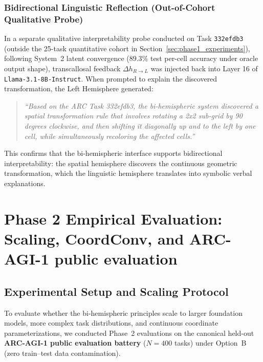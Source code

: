 \documentclass[11pt,a4paper]{article}
\theoremstyle{plain}
\theoremstyle{definition}
\theoremstyle{remark}
\begin{document}
\subsubsection{Bidirectional Linguistic Reflection (Out-of-Cohort Qualitative Probe)}

In a separate qualitative interpretability probe conducted on Task \texttt{332efdb3} (outside the 25-task quantitative cohort in Section~\ref{sec:phase1_experiments}), following System~2 latent convergence ($89.3\%$ test per-cell accuracy under oracle output shape), transcallosal feedback $\Delta h_{R \to L}$ was injected back into Layer 16 of \texttt{Llama-3.1-8B-Instruct}. When prompted to explain the discovered transformation, the Left Hemisphere generated:
\begin{quote}
\emph{``Based on the ARC Task 332efdb3, the bi-hemispheric system discovered a spatial transformation rule that involves rotating a 2x2 sub-grid by 90 degrees clockwise, and then shifting it diagonally up and to the left by one cell, while simultaneously recoloring the affected cells.''}
\end{quote}
This confirms that the bi-hemispheric interface supports bidirectional interpretability: the spatial hemisphere discovers the continuous geometric transformation, which the linguistic hemisphere translates into symbolic verbal explanations.

\section{Phase 2 Empirical Evaluation: Scaling, CoordConv, and ARC-AGI-1 public evaluation}
\label{sec:phase2_arc2}

\subsection{Experimental Setup and Scaling Protocol}

To evaluate whether the bi-hemispheric principles scale to larger foundation models, more complex task distributions, and continuous coordinate parameterizations, we conducted Phase~2 evaluations on the canonical held-out \textbf{ARC-AGI-1 public evaluation battery} ($N = 400$ tasks) under Option~B (zero train--test data contamination).
\end{document}

